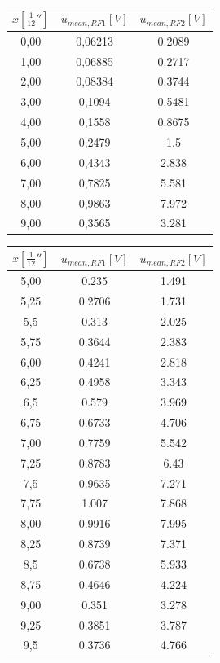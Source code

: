 \documentclass[a4paper]{article}
\begin{document}
\begin{minipage}[t]{0.5\textwidth}
    \centering
    \label{6-3-2-grobeMessungen}
    \begin{tabular}{|c|c|c|}
        \hline
        $x \unit{[\frac{1}{12}'']}$&  $u_{mean,RF1}\unit{[V]}$ &$u_{mean,RF2}\unit{[V]}$ \\
        \hline
        0,00 & 0,06213 &  0.2089\\
        1,00  & 0,06885 &  0.2717\\
        2,00  & 0,08384 &  0.3744\\
        3,00  & 0,1094  &   0.5481\\
        4,00  & 0,1558  &   0.8675\\
        5,00  & 0,2479  &   1.5\\   
        6,00  & 0,4343  &   2.838\\ 
        7,00  & 0,7825  &   5.581\\ 
        8,00  & 0,9863  &   7.972\\ 
        9,00  & 0,3565  &   3.281\\ 
        \hline
    \end{tabular}
\end{minipage}
\begin{minipage}[t]{0.5\textwidth}
    \centering
    \label{6-3-2-feineMessungen}
    \begin{tabular}{|c|c|c|}
        \hline
        $x \unit{[\frac{1}{12}'']}$&  $u_{mean,RF1}\unit{[V]}$ &$u_{mean,RF2}\unit{[V]}$ \\
        \hline
        5,00   & 0.235     &  1.491\\    
        5,25&     0.2706&      1.731\\
        5,5 & 0.313     &  2.025\\    
        5,75&     0.3644&      2.383\\
        6,00   & 0.4241    &  2.818\\    
        6,25&     0.4958&      3.343\\
        6,5 & 0.579     &  3.969\\    
        6,75&     0.6733&      4.706\\
        7,00   & 0.7759    &  5.542\\    
        7,25&     0.8783&      6.43\\ 
        7,5 & 0.9635    &  7.271\\    
        7,75&     1.007 &      7.868\\
        8,00   & 0.9916    &  7.995\\    
        8,25&     0.8739&      7.371\\
        8,5 & 0.6738    &  5.933\\    
        8,75&     0.4646&      4.224\\
        9,00   & 0.351     &  3.278\\    
        9,25&     0.3851&      3.787\\
        9,5 & 0.3736    &  4.766\\    
        \hline
    \end{tabular}
\end{minipage}
\end{document}
